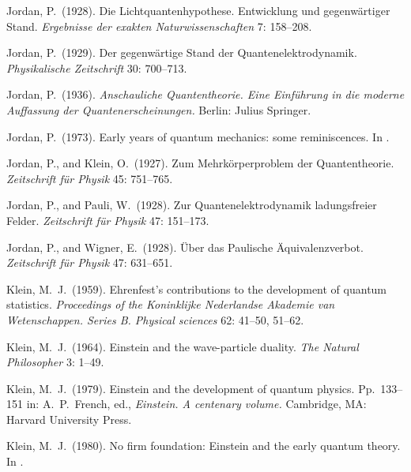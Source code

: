 \documentclass{elsart}
\begin{document}
{\begin{thebibliography}{}
 Jordan, P.\  (1928). Die Lichtquantenhypothese. Entwicklung und gegenw\"artiger Stand. {\it Ergebnisse der exakten Naturwissenschaften} 7: 158--208.

 Jordan, P.\  (1929). Der gegenw\"artige Stand der Quantenelektrodynamik. {\it Physikalische Zeitschrift} 30: 700--713.

 Jordan, P.\  (1936). {\it Anschauliche Quantentheorie. Eine Einf\"uhrung in die moderne Auffassung der Quantenerscheinungen.} Berlin: Julius Springer.

 Jordan, P.\  (1973). Early years of quantum mechanics: some reminiscences. In \citep[pp.\ 294--299]{Mehra 1973}. 

 Jordan, P., and Klein, O.\ (1927). Zum Mehrk\"orperproblem der Quantentheorie. {\it Zeitschrift f\"{u}r Physik} 45: 751--765.

 Jordan, P., and Pauli, W.\ (1928). Zur Quantenelektrodynamik ladungsfreier Felder. {\it Zeitschrift f\"{u}r Physik} 47: 151--173.

 Jordan, P., and Wigner, E.\ (1928). \"Uber das Paulische \"Aquivalenzverbot. {\it Zeitschrift f\"{u}r Physik} 47: 631--651.


  Klein, M.\ J.\ (1959). Ehrenfest's contributions to the development of quantum statistics. {\it Proceedings of the Koninklijke Nederlandse Akademie van Wetenschappen. Series B. Physical sciences} 62: 41--50, 51--62.

  Klein, M.\ J.\  (1964). Einstein and the wave-particle duality. {\it The Natural Philosopher} 3: 1--49.


  Klein, M.\ J.\  (1979). Einstein and the development of quantum physics. Pp.\ 133--151 in: A.\ P.\ French, ed., {\it Einstein. A centenary volume.} Cambridge, MA: Harvard University Press.  

  Klein, M.\ J.\  (1980). No firm foundation: Einstein and the early quantum theory. In \citep[pp.\ 161--185]{Woolf 1980}.


\end{thebibliography}}
\end{document}
